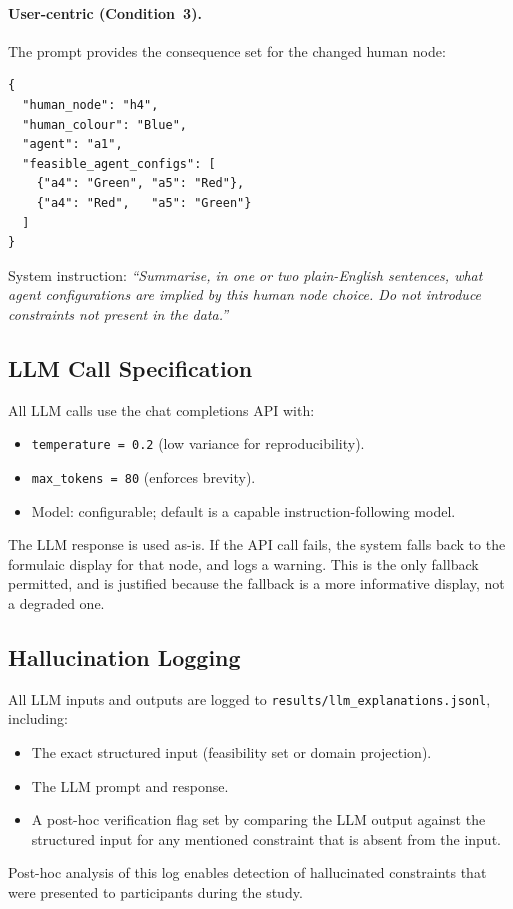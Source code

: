 \documentclass[10pt]{article}
\theoremstyle{definition}
\begin{document}
\paragraph{User-centric (Condition~3).}
The prompt provides the consequence set for the changed human node:
\begin{lstlisting}
{
  "human_node": "h4",
  "human_colour": "Blue",
  "agent": "a1",
  "feasible_agent_configs": [
    {"a4": "Green", "a5": "Red"},
    {"a4": "Red",   "a5": "Green"}
  ]
}
\end{lstlisting}
System instruction: \emph{``Summarise, in one or two plain-English sentences, what agent
configurations are implied by this human node choice. Do not introduce constraints not present
in the data.''}

\subsection{LLM Call Specification}

All LLM calls use the chat completions API with:
\begin{itemize}
  \item \texttt{temperature = 0.2} (low variance for reproducibility).
  \item \texttt{max\_tokens = 80} (enforces brevity).
  \item Model: configurable; default is a capable instruction-following model.
\end{itemize}
The LLM response is used as-is.  If the API call fails, the system falls back to the formulaic
display for that node, and logs a warning.  This is the only fallback permitted, and is
justified because the fallback is a more informative display, not a degraded one.

\subsection{Hallucination Logging}

All LLM inputs and outputs are logged to \texttt{results/llm\_explanations.jsonl}, including:
\begin{itemize}
  \item The exact structured input (feasibility set or domain projection).
  \item The LLM prompt and response.
  \item A post-hoc verification flag set by comparing the LLM output against the structured
        input for any mentioned constraint that is absent from the input.
\end{itemize}
Post-hoc analysis of this log enables detection of hallucinated constraints that were presented
to participants during the study.
\end{document}
